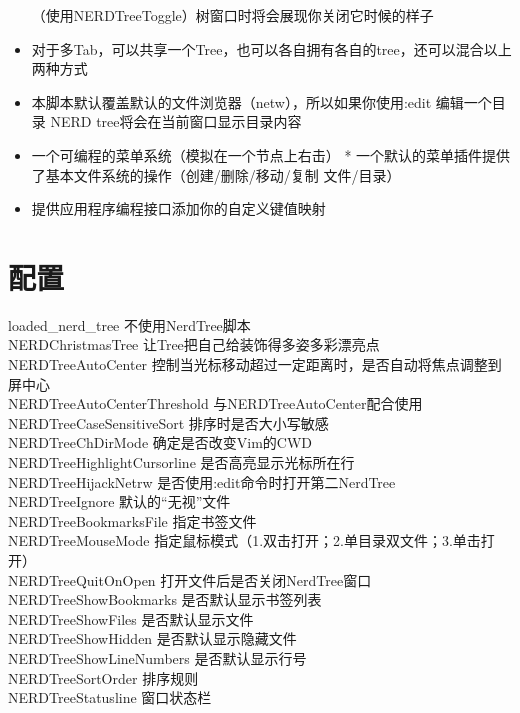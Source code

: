\begin{itemize}
        （使用NERDTreeToggle）树窗口时将会展现你关闭它时候的样子
    \item 对于多Tab，可以共享一个Tree，也可以各自拥有各自的tree，还可以混合以上两种方式
    \item 本脚本默认覆盖默认的文件浏览器（netw），所以如果你使用:edit 编辑一个目录
        NERD tree将会在当前窗口显示目录内容
    \item 一个可编程的菜单系统（模拟在一个节点上右击）
        * 一个默认的菜单插件提供了基本文件系统的操作（创建/删除/移动/复制 文件/目录）\\
    \item 提供应用程序编程接口添加你的自定义键值映射
\end{itemize}

\section{配置}
loaded\_nerd\_tree          不使用NerdTree脚本\\
NERDChristmasTree           让Tree把自己给装饰得多姿多彩漂亮点\\
NERDTreeAutoCenter          控制当光标移动超过一定距离时，是否自动将焦点调整到屏中心\\
NERDTreeAutoCenterThreshold 与NERDTreeAutoCenter配合使用\\
NERDTreeCaseSensitiveSort   排序时是否大小写敏感\\
NERDTreeChDirMode           确定是否改变Vim的CWD\\
NERDTreeHighlightCursorline 是否高亮显示光标所在行\\
NERDTreeHijackNetrw         是否使用:edit命令时打开第二NerdTree\\
NERDTreeIgnore              默认的“无视”文件\\
NERDTreeBookmarksFile       指定书签文件\\
NERDTreeMouseMode           指定鼠标模式（1.双击打开；2.单目录双文件；3.单击打开）\\
NERDTreeQuitOnOpen          打开文件后是否关闭NerdTree窗口\\
NERDTreeShowBookmarks       是否默认显示书签列表\\
NERDTreeShowFiles           是否默认显示文件\\
NERDTreeShowHidden          是否默认显示隐藏文件\\
NERDTreeShowLineNumbers     是否默认显示行号\\
NERDTreeSortOrder           排序规则\\
NERDTreeStatusline          窗口状态栏\\
